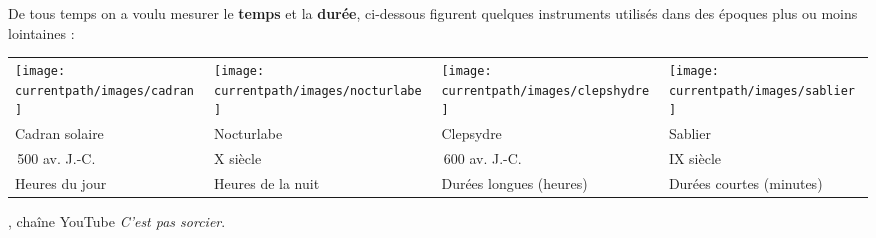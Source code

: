 \vspace*{-8mm}

\vspace*{-5mm}
\begin{debat}
    De tous temps on a voulu mesurer le {\bf temps} et la {\bf durée}, ci-dessous figurent quelques instruments utilisés dans des époques plus ou moins lointaines : \\
    \textcolor{B1}{\small
    \begin{tabular}{*{4}{>{\centering\arraybackslash}p{3.5cm}}}
       \texttt{[image: \\currentpath/images/cadran]}
       &
       \texttt{[image: \\currentpath/images/nocturlabe]}
       &
       \texttt{[image: \\currentpath/images/clepshydre]}
       &
       \texttt{[image: \\currentpath/images/sablier]} \\
       Cadran solaire & Nocturlabe & Clepsydre & Sablier \\
       1\,500 av. J.-C. & X\up{e} siècle & 1\,600 av. J.-C. & IX\up{e} siècle \\
       Heures du jour & Heures de la nuit & Durées longues (heures) & Durées courtes (minutes) \\
    \end{tabular}}
    \begin{cadre}[B2][F4]
       \begin{center}
          , chaîne YouTube {\it C'est pas sorcier}.
       \end{center}
    \end{cadre}
 \end{debat}